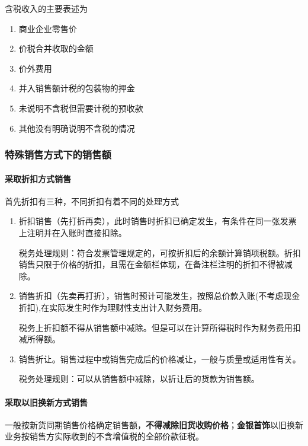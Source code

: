 \documentclass[UTF8,12pt]{ctexart}
\numberwithin{equation}{section} %
\numberwithin{figure}{section}
\numberwithin{table}{section}
\begin{document}
	含税收入的主要表述为
	\begin{enumerate}
		\item 商业企业零售价 
		
		\item 价税合并收取的金额 
		
		\item 价外费用
		
		\item 并入销售额计税的包装物的押金 
		
		\item 未说明不含税但需要计税的预收款 
		
		\item 其他没有明确说明不含税的情况 
	\end{enumerate}
	
	\subsubsection{特殊销售方式下的销售额}
	\paragraph{采取折扣方式销售}
	
	首先折扣有三种，不同折扣有着不同的处理方式
	\begin{enumerate}
		\item 折扣销售（先打折再卖），此时销售时折扣已确定发生，有条件在同一张发票上注明并在入账时直接扣除。
		
		税务处理规则：符合发票管理规定的，可按折扣后的余额计算销项税额。折扣销售只限于价格的折扣，且需在金额栏体现，在备注栏注明的折扣不得被减除。
		
		\item 销售折扣（先卖再打折），销售时预计可能发生，按照总价款入账(不考虑现金折扣),在实际发生时作为理财性支出计入财务费用。
		
		税务上折扣额不得从销售额中减除。但是可以在计算所得税时作为财务费用扣减所得额。
		
		\item 销售折让。销售过程中或销售完成后的价格减让，一般与质量或适用性有关。
		
		税务处理规则：可以从销售额中减除，以折让后的货款为销售额。
	\end{enumerate}
	
	\paragraph{采取以旧换新方式销售}
	一般按新货同期销售价格确定销售额，\textbf{不得减除旧货收购价格}；\textbf{金银首饰}以旧换新业务按销售方实际收到的不含增值税的全部价款征税。
	
\end{document}
